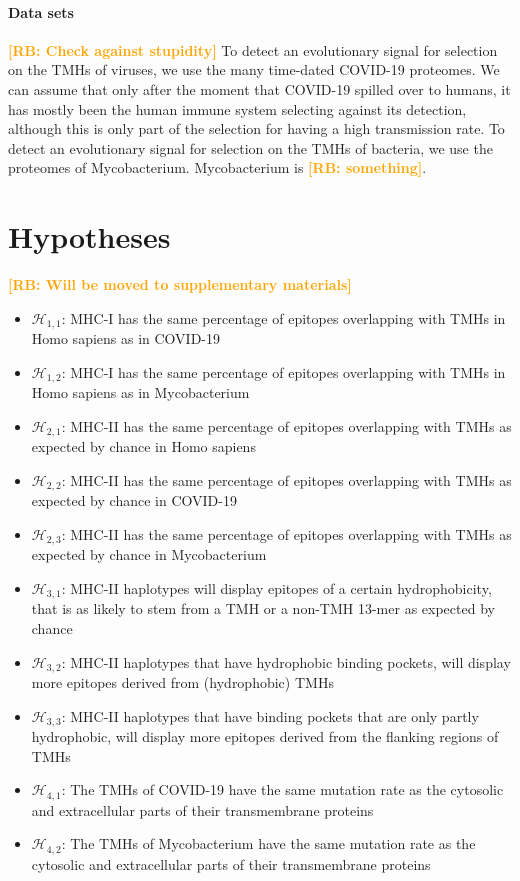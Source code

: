 \documentclass{article}
\newcommand{\richel}[1]{\textcolor{orange}{\textbf{[RB: #1]}}}
\begin{document}
\paragraph{Data sets}

\richel{Check against stupidity}
To detect an evolutionary signal for selection on the TMHs of viruses, 
we use the many time-dated COVID-19 proteomes.
We can assume that only after the moment that COVID-19 spilled over 
to humans, it has mostly been the human immune system selecting against
its detection, although this is only part of the selection for 
having a high transmission rate.
To detect an evolutionary signal for selection on the TMHs of bacteria, 
we use the proteomes of Mycobacterium. Mycobacterium is \richel{something}.


\section{Hypotheses}

\richel{Will be moved to supplementary materials}

\begin{itemize}
  \item $\mathcal{H}_{1,1}$: MHC-I has the same percentage of epitopes overlapping
    with TMHs in Homo sapiens as in COVID-19
  \item $\mathcal{H}_{1,2}$: MHC-I has the same percentage of epitopes overlapping
    with TMHs in Homo sapiens as in Mycobacterium
  \item $\mathcal{H}_{2,1}$: MHC-II has the same percentage of epitopes overlapping
    with TMHs as expected by chance in Homo sapiens
  \item $\mathcal{H}_{2,2}$: MHC-II has the same percentage of epitopes overlapping
    with TMHs as expected by chance in COVID-19
  \item $\mathcal{H}_{2,3}$: MHC-II has the same percentage of epitopes overlapping
    with TMHs as expected by chance in Mycobacterium
  \item $\mathcal{H}_{3,1}$: MHC-II haplotypes will display epitopes
    of a certain hydrophobicity, that is as likely to stem from
    a TMH or a non-TMH 13-mer as expected by chance
  \item $\mathcal{H}_{3,2}$: MHC-II haplotypes that have hydrophobic
    binding pockets, will display more epitopes derived from (hydrophobic)
    TMHs
  \item $\mathcal{H}_{3,3}$: MHC-II haplotypes that have binding pockets
    that are only partly hydrophobic, will display more epitopes derived 
    from the flanking regions of TMHs
  \item $\mathcal{H}_{4,1}$: The TMHs of COVID-19
    have the same mutation rate 
    as the cytosolic and extracellular parts of their transmembrane proteins
  \item $\mathcal{H}_{4,2}$: The TMHs of Mycobacterium
    have the same mutation rate 
    as the cytosolic and extracellular parts of their transmembrane proteins
\end{itemize}
\end{document}
